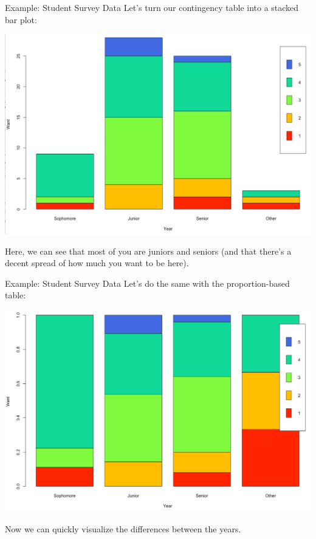 \begin{frame}{Example: Student Survey Data}
    Let's turn our contingency table into a stacked bar plot:
    \begin{center}
        \includegraphics[scale=0.18]{images/exbarplot.png}
    \end{center}
    Here, we can see that most of you are juniors and seniors (and that there's a decent spread of how much you want to be here).
\end{frame}

\begin{frame}{Example: Student Survey Data}
    Let's do the same with the proportion-based table:
    \begin{center}
        \includegraphics[scale=0.2]{images/exbarplot2.png}
    \end{center}
    Now we can quickly visualize the differences between the years.
\end{frame}


